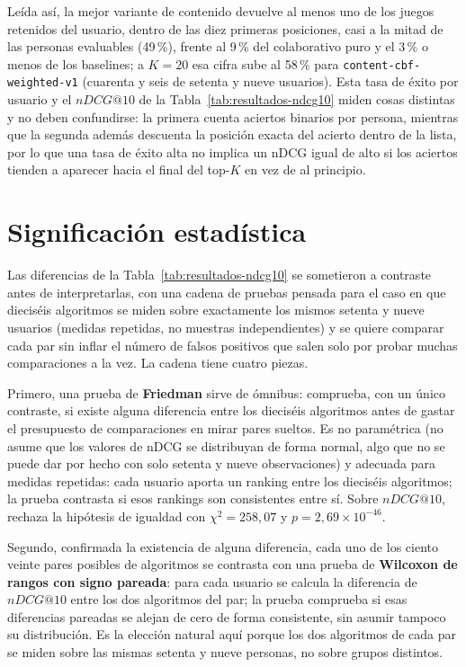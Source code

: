 Leída así, la mejor variante de contenido devuelve al menos uno de los juegos retenidos del
usuario, dentro de las diez primeras posiciones, casi a la mitad de las personas evaluables
(49\,\%), frente al 9\,\% del colaborativo puro y el 3\,\% o menos de los baselines; a
\(K=20\) esa cifra sube al 58\,\% para \texttt{content-cbf-weighted-v1} (cuarenta y seis de
setenta y nueve usuarios). Esta tasa de éxito por usuario y el \(nDCG@10\) de la
Tabla~\ref{tab:resultados-ndcg10} miden cosas distintas y no deben confundirse: la primera
cuenta aciertos binarios por persona, mientras que la segunda además descuenta la posición
exacta del acierto dentro de la lista, por lo que una tasa de éxito alta no implica un nDCG
igual de alto si los aciertos tienden a aparecer hacia el final del top-\(K\) en vez de al
principio.

\section{Significación estadística}\label{sec:exp-significacion}

Las diferencias de la Tabla~\ref{tab:resultados-ndcg10} se sometieron a contraste antes de
interpretarlas, con una cadena de pruebas pensada para el caso en que dieciséis algoritmos se
miden sobre exactamente los mismos setenta y nueve usuarios (medidas repetidas, no muestras
independientes) y se quiere comparar cada par sin inflar el número de falsos positivos que
salen solo por probar muchas comparaciones a la vez. La cadena tiene cuatro piezas.

Primero, una prueba de \textbf{Friedman} sirve de ómnibus: comprueba, con un único contraste,
si existe alguna diferencia entre los dieciséis algoritmos antes de gastar el presupuesto de
comparaciones en mirar pares sueltos. Es no paramétrica (no asume que los valores de nDCG se
distribuyan de forma normal, algo que no se puede dar por hecho con solo setenta y nueve
observaciones) y adecuada para medidas repetidas: cada usuario aporta un ranking entre los
dieciséis algoritmos; la prueba contrasta si esos rankings son consistentes entre sí. Sobre
\(nDCG@10\), rechaza la hipótesis de igualdad con \(\chi^2=258{,}07\) y
\(p=2{,}69\times10^{-46}\).

Segundo, confirmada la existencia de alguna diferencia, cada uno de los ciento veinte pares
posibles de algoritmos se contrasta con una prueba de \textbf{Wilcoxon de rangos con signo
pareada}: para cada usuario se calcula la diferencia de \(nDCG@10\) entre los dos algoritmos
del par; la prueba comprueba si esas diferencias pareadas se alejan de cero de forma
consistente, sin asumir tampoco su distribución. Es la elección natural aquí porque los dos
algoritmos de cada par se miden sobre las mismas setenta y nueve personas, no sobre grupos
distintos.

